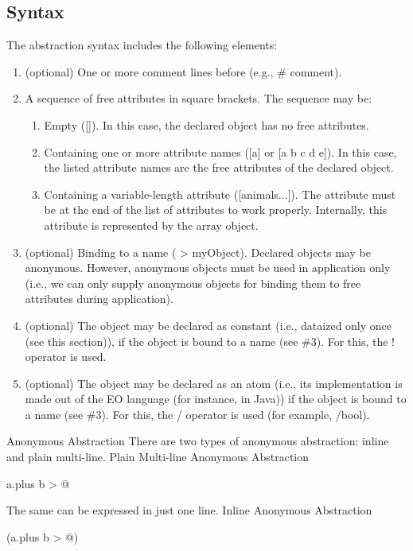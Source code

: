 \documentclass[12pt]{book}
\begin{document}
\subsection{Syntax}
The abstraction syntax includes the following elements:

\begin{enumerate}
    \item (optional) One or more comment lines before (e.g., \# comment).
    \item A sequence of free attributes in square brackets. The sequence may be:
    \begin{enumerate}
        \item Empty ([]). In this case, the declared object has no free attributes.
        \item Containing one or more attribute names ([a] or [a b c d e]). In this case, the listed attribute names are the free attributes of the declared object.
        \item Containing a variable-length attribute ([animals...]). The attribute must be at the end of the list of attributes to work properly. Internally, this attribute is represented by the array object.
    \end{enumerate}
    \item (optional) Binding to a name ( > myObject). Declared objects may be anonymous. However, anonymous objects must be used in application only (i.e., we can only supply anonymous objects for binding them to free attributes during application).
    \item (optional) The object may be declared as constant (i.e., dataized only once (see this section)), if the object is bound to a name (see \#3). For this, the ! operator is used.
    \item (optional) The object may be declared as an atom (i.e., its implementation is made out of the EO language (for instance, in Java)) if the object is bound to a name (see \#3). For this, the / operator is used (for example, /bool).
\end{enumerate}
Anonymous Abstraction
There are two types of anonymous abstraction: inline and plain multi-line.
Plain Multi-line Anonymous Abstraction

\begin{ffcode}
[a b]
  a.plus b > @
\end{ffcode}

The same can be expressed in just one line.
Inline Anonymous Abstraction

\begin{ffcode}
[a b] (a.plus b > @)
\end{ffcode}
\end{document}
